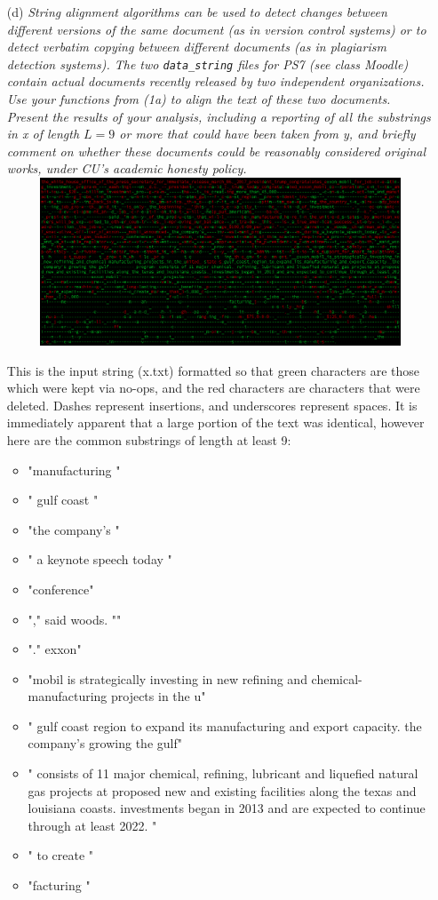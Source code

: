 \documentclass[11pt]{article} \setlength{\oddsidemargin}{0in}
\begin{document}
{\begin{enumerate}
  \item[(d)] \textit{String alignment algorithms can be used to detect
      changes between different versions of the same document (as in
      version control systems) or to detect verbatim copying between
      different documents (as in plagiarism detection systems).  The
      two \texttt{data\_string} files for PS7 (see class Moodle)
      contain actual documents recently released by two independent
      organizations. Use your functions from (1a) to align the text of
      these two documents. Present the results of your analysis,
      including a reporting of all the substrings in x of length
      $L = 9$ or more that could have been taken from y, and briefly
      comment on whether these documents could be reasonably
      considered original works, under CU's academic honesty policy.}
    \\    
    \includegraphics[width=15cm,height=5cm]{1d}

    This is the input string (x.txt) formatted so that green characters are those which were kept via no-ops, and the red characters are characters that were deleted. Dashes represent insertions, and underscores represent spaces. It is immediately apparent that a large portion of the text was identical, however here are the common substrings of length at least 9:

    \begin{itemize}
      \item "manufacturing "
      \item " gulf coast "
      \item "the company's "
      \item " a keynote speech today "
      \item "conference"
      \item "," said woods. ""
      \item "."  exxon"
      \item "mobil is strategically investing in new refining and chemical-manufacturing projects in the u"
      \item " gulf coast region to expand its manufacturing and export capacity. the company’s growing the gulf"
      \item " consists of 11 major chemical, refining, lubricant and liquefied natural gas projects at proposed new and existing facilities along the texas and louisiana coasts. investments began in 2013 and are expected to continue through at least 2022. "
      \item " to create "
      \item "facturing "
    \end{itemize}


\end{enumerate}}
\end{document}
